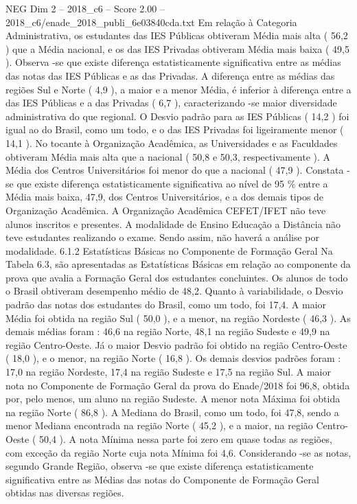 \begin{textsample}{NEG Dim 2 – 2018\_c6 – Score 2.00 – 2018\_c6/enade\_2018\_publi\_6e03840cda.txt}
Em relação à Categoria Administrativa, os estudantes das IES Públicas obtiveram Média mais alta ( 56,2 ) que a Média nacional, e os das IES Privadas obtiveram Média mais baixa ( 49,5 ).
Observa -se que existe diferença estatisticamente significativa entre as médias das notas das IES Públicas e as das Privadas.
A diferença entre as médias das regiões Sul e Norte ( 4,9 ), a maior e a menor Média, é inferior à diferença entre a das IES Públicas e a das Privadas ( 6,7 ), caracterizando -se maior diversidade administrativa do que regional.
O Desvio padrão para as IES Públicas ( 14,2 ) foi igual ao do Brasil, como um todo, e o das IES Privadas foi ligeiramente menor ( 14,1 ).
No tocante à Organização Acadêmica, as Universidades e as Faculdades obtiveram Média mais alta que a nacional ( 50,8 e 50,3, respectivamente ).
A Média dos Centros Universitários foi menor do que a nacional ( 47,9 ).
Constata -se que existe diferença estatisticamente significativa ao nível de 95 \% entre a Média mais baixa, 47,9, dos Centros Universitários, e a dos demais tipos de Organização Acadêmica.
A Organização Acadêmica CEFET/IFET não teve alunos inscritos e presentes.
A modalidade de Ensino Educação a Distância não teve estudantes realizando o exame.
Sendo assim, não haverá a análise por modalidade. 6.1.2 Estatísticas Básicas no Componente de Formação Geral Na Tabela 6.3, são apresentadas as Estatísticas Básicas em relação ao componente da prova que avalia a Formação Geral dos estudantes concluintes.
Os alunos de todo o Brasil obtiveram desempenho médio de 48,2.
Quanto à variabilidade, o Desvio padrão das notas dos estudantes do Brasil, como um todo, foi 17,4.
A maior Média foi obtida na região Sul ( 50,0 ), e a menor, na região Nordeste ( 46,3 ).
As demais médias foram : 46,6 na região Norte, 48,1 na região Sudeste e 49,9 na região Centro-Oeste.
Já o maior Desvio padrão foi obtido na região Centro-Oeste ( 18,0 ), e o menor, na região Norte ( 16,8 ).
Os demais desvios padrões foram : 17,0 na região Nordeste, 17,4 na região Sudeste e 17,5 na região Sul.
A maior nota no Componente de Formação Geral da prova do Enade/2018 foi 96,8, obtida por, pelo menos, um aluno na região Sudeste.
A menor nota Máxima foi obtida na região Norte ( 86,8 ).
A Mediana do Brasil, como um todo, foi 47,8, sendo a menor Mediana encontrada na região Norte ( 45,2 ), e a maior, na região Centro-Oeste ( 50,4 ).
A nota Mínima nessa parte foi zero em quase todas as regiões, com exceção da região Norte cuja nota Mínima foi 4,6.
Considerando -se as notas, segundo Grande Região, observa -se que existe diferença estatisticamente significativa entre as Médias das notas do Componente de Formação Geral obtidas nas diversas regiões.

\end{textsample}
